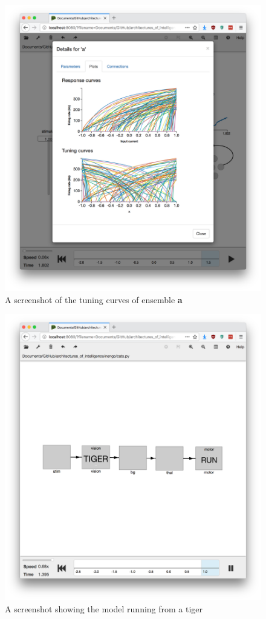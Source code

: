 \documentclass[12pt, a4paper, titlepage]{article}
\begin{document}
\begin{figure}[p]
	\includegraphics[width=\textwidth]{screenshot_part_1_b.png}
	\caption{A screenshot of the tuning curves of ensemble \textbf{a}}
	\label{fig:1b}
\end{figure}
\begin{figure}[p]
	\includegraphics[width=\textwidth]{screenshot_part_2.png}
	\caption{A screenshot showing the model running from a tiger}
	\label{fig:2}
\end{figure}
\end{document}
